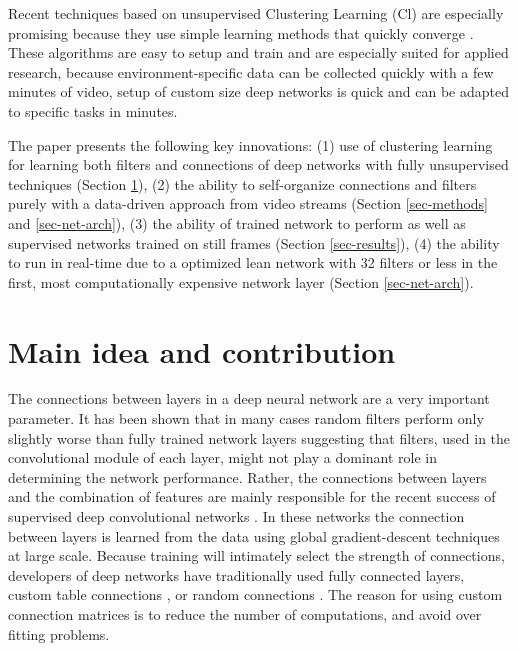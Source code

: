 \documentclass{article} %
\begin{document}
Recent techniques based on unsupervised Clustering Learning (Cl) are especially promising because they use simple learning methods that quickly converge \cite{culurciello2013clustering,coates_analysis_2011}. 
These algorithms are easy to setup and train and are especially suited for applied research, because environment-specific data can be collected quickly with a few minutes of video, setup of custom size deep networks is quick and can be adapted to specific tasks in minutes.

The paper presents the following key innovations: (1) use of clustering learning for learning both filters and connections of deep networks with fully unsupervised techniques (Section \ref{sec-main}), (2) the ability to self-organize connections and filters purely with a data-driven approach from video streams (Section \ref{sec-methods} and  \ref{sec-net-arch}), (3) the ability of trained network to perform as well as supervised networks trained on still frames (Section \ref{sec-results}), (4) the ability to run in real-time due to a optimized lean network with 32 filters or less in the first, most computationally expensive network layer (Section \ref{sec-net-arch}). 



\section{Main idea and contribution}
\label{sec-main}

The connections between layers in a deep neural network are a very important parameter. It has been shown that in many cases random filters perform only slightly worse than fully trained network layers \cite{saxe2011random} suggesting that filters, used in the convolutional module of each layer, might not play a dominant role in determining the network performance.
Rather, the connections between layers and the combination of features are mainly responsible for the recent success of supervised deep convolutional networks \cite{krizhevsky_imagenet_2012}. In these networks the connection between layers is learned from the data using global gradient-descent techniques at large scale. Because training will intimately select the strength of connections, developers of deep networks have traditionally used fully connected layers, custom table connections \cite{lecun_gradient-based_1998}, or random connections \cite{lecun_convolutional_2010}. The reason for using custom connection matrices is to reduce the number of computations, and avoid over fitting problems.
 
\end{document}
